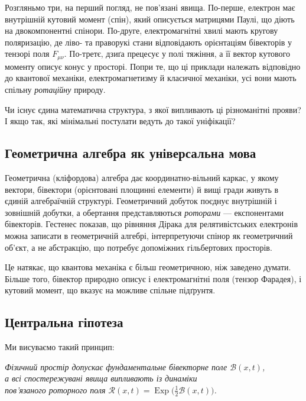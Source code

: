\documentclass[11pt,a4paper]{article}
\newcommand{\Exp}{\operatorname{Exp}}
\newcommand{\Rotor}{\mathcal{R}}
\newcommand{\Biv}{\mathcal{B}}
\theoremstyle{definition}
\theoremstyle{plain}
\theoremstyle{remark}
\begin{document}
Розгляньмо три, на перший погляд, не пов’язані явища. По-перше, електрон має внутрішній кутовий момент (спін), який описується матрицями Паулі, що діють на двокомпонентні спінори. По-друге, електромагнітні хвилі мають кругову поляризацію, де ліво- та праворукі стани відповідають орієнтаціям бівекторів у тензорі поля $F_{\mu\nu}$. По-третє, дзиґа прецесує у полі тяжіння, а її вектор кутового моменту описує конус у просторі. Попри те, що ці приклади належать відповідно до квантової механіки, електромагнетизму й класичної механіки, усі вони мають спільну \emph{ротаційну} природу.

Чи існує єдина математична структура, з якої випливають ці різноманітні прояви? І якщо так, які мінімальні постулати ведуть до такої уніфікації?

\subsection{Геометрична алгебра як універсальна мова}

Геометрична (кліфордова) алгебра дає координатно-вільний каркас, у якому вектори, бівектори (орієнтовані площинні елементи) й вищі гради живуть в єдиній алгебраїчній структурі. Геометричний добуток поєднує внутрішній і зовнішній добутки, а обертання представляються \emph{роторами} — експонентами бівекторів. Гестенес показав, що рівняння Дірака для релятивістських електронів можна записати в геометричній алгебрі, інтерпретуючи спінор як геометричний об’єкт, а не абстракцію, що потребує допоміжних гільбертових просторів.

Це натякає, що квантова механіка є більш геометричною, ніж заведено думати. Більше того, бівектор природно описує і електромагнітні поля (тензор Фарадея), і кутовий момент, що вказує на можливе спільне підґрунтя.

\subsection{Центральна гіпотеза}

Ми висуваємо такий принцип:

\begin{center}
\textit{Фізичний простір допускає фундаментальне бівекторне поле $\Biv(x,t)$, \\
а всі спостережувані явища випливають із динаміки \\
пов’язаного роторного поля $\Rotor(x,t)=\Exp\!\big(\tfrac{1}{2}\Biv(x,t)\big)$.}
\end{center}
\end{document}
